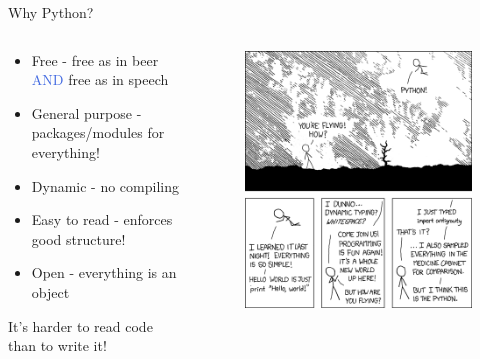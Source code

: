 \documentclass[11pt,professionalfonts,aspectratio=169,final]{beamer}
\def\Emph{\textcolor{RoyalBlue}}
\begin{document}
\begin{frame}{Why Python?}
    \begin{columns}
    \begin{column}{0.5\textwidth}
    \begin{itemize}
        \item Free - free as in beer \Emph{AND} free as in speech
        \item General purpose - packages/modules for everything!
        \item Dynamic - no compiling
        \item Easy to read - enforces good structure!
        \item Open - everything is an object
    \end{itemize}
    \begin{block}{}
        It's harder to read code than to write it!
    \end{block}
    \end{column}
    \begin{column}{0.5\textwidth}
        \begin{figure}
            \centering
            \includegraphics[width=\columnwidth,height=0.8\textheight,keepaspectratio]{figures/python.png}
        \end{figure}
    \end{column}
    \end{columns}
\end{frame}
\end{document}
